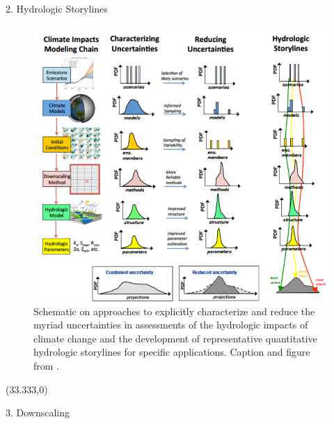 \documentclass{beamer}
\begin{document}
\begin{frame}{}
\begin{columns}
\begin{column}{.3333\paperwidth}
\begin{textblock}{\textwidth \TPHorizModule}
\begin{block}{2. Hydrologic Storylines}
\begin{itemize}
     \end{itemize}

     \begin{figure}
      \center\includegraphics[width=\linewidth]{figures/storylines_diag.png}
      \caption{Schematic on approaches to explicitly characterize and reduce the myriad uncertainties in assessments of the hydrologic impacts of climate change and the development of representative quantitative hydrologic storylines for specific applications. Caption and figure from \citep{Clark_2016}.
       \label{fig:storylines}}
     \end{figure}

    \end{block}
   \end{textblock}



   \begin{textblock}{\textwidth \TPHorizModule}(33.333,0)
    \begin{block}{3. Downscaling}

\end{block}
\end{textblock}
\end{column}
\end{columns}
\end{frame}
\end{document}
